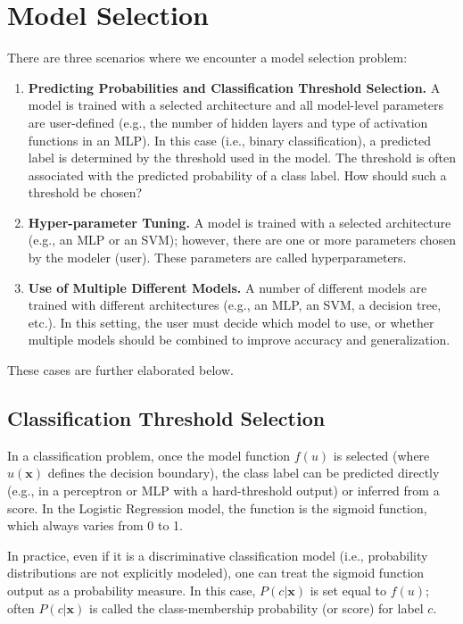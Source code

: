 \documentclass[12pt]{article}
\begin{document}
\section{Model Selection}
There are three scenarios where we encounter a model selection problem:
\begin{enumerate}
    \item \textbf{Predicting Probabilities and Classification Threshold Selection.} A model is trained with a selected architecture and all model-level parameters are user-defined (e.g., the number of hidden layers and type of activation functions in an MLP). In this case (i.e., binary classification), a predicted label is determined by the threshold used in the model. The threshold is often associated with the predicted probability of a class label. How should such a threshold be chosen?
    
    \item \textbf{Hyper-parameter Tuning.} A model is trained with a selected architecture (e.g., an MLP or an SVM); however, there are one or more parameters chosen by the modeler (user). These parameters are called hyperparameters.
    
    \item \textbf{Use of Multiple Different Models.} A number of different models are trained with different architectures (e.g., an MLP, an SVM, a decision tree, etc.). In this setting, the user must decide which model to use, or whether multiple models should be combined to improve accuracy and generalization.
\end{enumerate}

These cases are further elaborated below.

\subsection{Classification Threshold Selection}
In a classification problem, once the model function \(f(u)\) is selected (where \(u(\mathbf{x})\) defines the decision boundary), the class label can be predicted directly (e.g., in a perceptron or MLP with a hard-threshold output) or inferred from a score. In the Logistic Regression model, the function is the sigmoid function, which always varies from 0 to 1.

In practice, even if it is a discriminative classification model (i.e., probability distributions are not explicitly modeled), one can treat the sigmoid function output as a probability measure. In this case, \(P(c|\mathbf{x})\) is set equal to \(f(u)\); often \(P(c|\mathbf{x})\) is called the class-membership probability (or score) for label \(c\).
\end{document}
